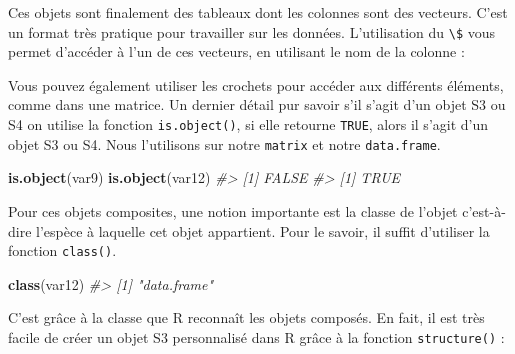 \documentclass[]{article}
\newenvironment{Shaded}{\begin{snugshade}}{\end{snugshade}}
\newcommand{\CommentTok}[1]{\textcolor[rgb]{0.56,0.35,0.01}{\textit{#1}}}
\newcommand{\DataTypeTok}[1]{\textcolor[rgb]{0.13,0.29,0.53}{#1}}
\newcommand{\KeywordTok}[1]{\textcolor[rgb]{0.13,0.29,0.53}{\textbf{#1}}}
\newcommand{\NormalTok}[1]{#1}
\newcommand{\OperatorTok}[1]{\textcolor[rgb]{0.81,0.36,0.00}{\textbf{#1}}}
\newcommand{\StringTok}[1]{\textcolor[rgb]{0.31,0.60,0.02}{#1}}
\begin{document}
Ces objets sont finalement des tableaux dont les colonnes sont des vecteurs.
C'est un format très pratique pour travailler sur les données. L'utilisation du
\texttt{\textbackslash{}\$} vous permet d'accéder à l'un de ces vecteurs, en utilisant le nom de
la colonne :

\begin{Shaded}
\end{Shaded}

Vous pouvez également utiliser les crochets pour accéder aux différents éléments, comme dans une matrice. Un dernier détail pur savoir s'il s'agit d'un objet S3 ou S4 on utilise la fonction \texttt{is.object()}, si elle retourne \texttt{TRUE}, alors il s'agit d'un objet S3 ou S4. Nous l'utilisons sur notre \texttt{matrix} et notre \texttt{data.frame}.

\begin{Shaded}
\begin{Highlighting}[]
\KeywordTok{is.object}\NormalTok{(var9)}
\KeywordTok{is.object}\NormalTok{(var12)}
\CommentTok{#> [1] FALSE}
\CommentTok{#> [1] TRUE}
\end{Highlighting}
\end{Shaded}

Pour ces objets composites, une notion importante est la classe de l'objet c'est-à-dire l'espèce à laquelle cet objet appartient. Pour le savoir, il suffit d'utiliser la fonction \texttt{class()}.

\begin{Shaded}
\begin{Highlighting}[]
\KeywordTok{class}\NormalTok{(var12)}
\CommentTok{#> [1] "data.frame"}
\end{Highlighting}
\end{Shaded}

C'est grâce à la classe que R reconnaît les objets composés. En fait, il est
très facile de créer un objet S3 personnalisé dans R grâce à la fonction
\texttt{structure()} :

\begin{Shaded}
\end{Shaded}
\end{document}
